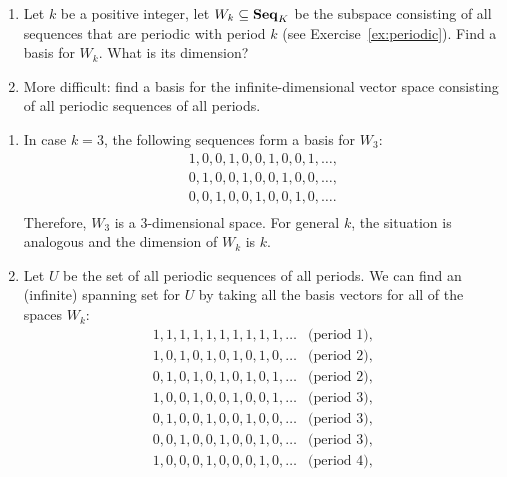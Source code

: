 \begin{ex}
  \begin{enumerate}
  \item Let $k$ be a positive integer, let $W_k\subseteq\mathbf{Seq}_K$ be the
    subspace consisting of all sequences that are periodic%
     with period $k$ (see
    Exercise~\ref{ex:periodic}). Find a basis for $W_k$. What is its
    dimension?
  \item More difficult: find a basis for the infinite-dimensional
    vector space consisting of all periodic sequences of all periods.
  \end{enumerate}
  \begin{sol}
    \begin{enumerate}
    \item In case $k=3$, the following sequences form a basis for
      $W_3$:
      \begin{equation*}
        \begin{array}{l}
          1,0,0,1,0,0,1,0,0,1,\ldots,\\
          0,1,0,0,1,0,0,1,0,0,\ldots,\\
          0,0,1,0,0,1,0,0,1,0,\ldots.\\
        \end{array}
      \end{equation*}
      Therefore, $W_3$ is a 3-dimensional space. For general $k$,
      the situation is analogous and the dimension of $W_k$ is $k$.
    \item Let $U$ be the set of all periodic sequences of all
      periods. We can find an (infinite) spanning set for $U$ by
      taking all the basis vectors for all of the spaces $W_k$:
      \begin{equation*}
        \begin{array}{ll}
          1,1,1,1,1,1,1,1,1,1,\ldots & \mbox{(period $1$)},\\[1ex]
          1,0,1,0,1,0,1,0,1,0,\ldots & \mbox{(period $2$)},\\
          0,1,0,1,0,1,0,1,0,1,\ldots & \mbox{(period $2$)},\\[1ex]
          1,0,0,1,0,0,1,0,0,1,\ldots & \mbox{(period $3$)},\\
          0,1,0,0,1,0,0,1,0,0,\ldots & \mbox{(period $3$)},\\
          0,0,1,0,0,1,0,0,1,0,\ldots & \mbox{(period $3$)},\\[1ex]
          1,0,0,0,1,0,0,0,1,0,\ldots & \mbox{(period $4$)},\\

\end{array}
\end{equation*}
\end{enumerate}
\end{sol}
\end{ex}
